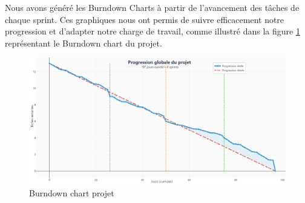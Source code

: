 Nous avons généré les Burndown Charts à partir de l’avancement des tâches de chaque sprint. Ces graphiques nous ont permis de suivre efficacement notre progression et d’adapter notre charge de travail, comme illustré dans la figure \ref{fig:burndownChart} représentant le Burndown chart du projet.
\begin{figure}[H] 
    \centering 
    \includegraphics[width=0.97\linewidth]{chapitres/ch2/img/burndown.png} 
    \caption{Burndown chart projet} 
    \label{fig:burndownChart} \end{figure} 
\vspace{-0.8cm}
